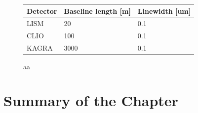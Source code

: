 \begin{figure}[p]
\begin{center}
    \label{img:img327}
  \end{center}
    \caption{aa}  
  \begin{center}
    \begin{tabular}{lll} 
      \hline      
      Detector & Baseline length [m] & Linewidth [um] \\ \hline \hline
      LISM  & 20   & 0.1 \\
      CLIO  & 100  & 0.1 \\
      KAGRA & 3000 & 0.1 \\      
    \end{tabular}
    \label{tb:31}
  \end{center} 
\end{figure} 



\section{Summary of the Chapter}
